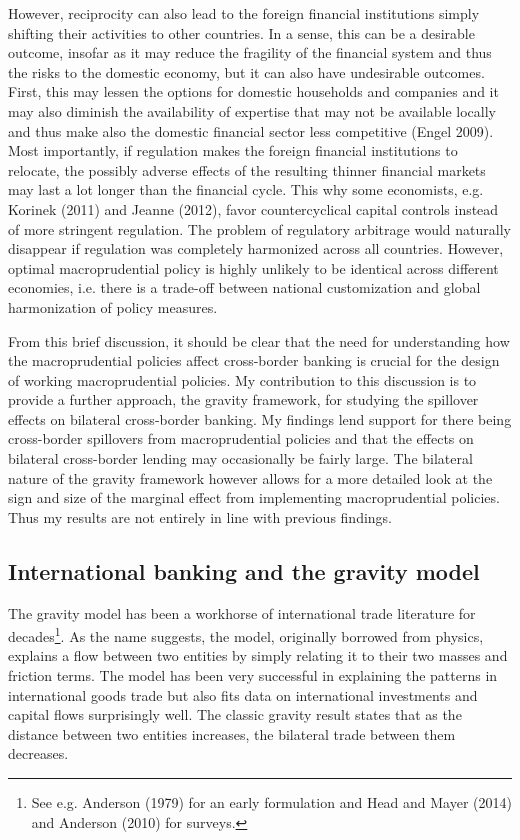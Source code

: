 \documentclass[12pt,a4paper]{article}
\begin{document}
However, reciprocity can also lead to the foreign financial institutions simply shifting their activities to other countries. In a sense, this can be a desirable outcome, insofar as it may reduce the fragility of the financial system and thus the risks to the domestic economy, but it can also have undesirable outcomes. First, this may lessen the options for domestic households and companies and it may also diminish the availability of expertise that may not be available locally and thus make also the domestic financial sector less competitive (Engel 2009). Most importantly, if regulation makes the foreign financial institutions to relocate, the possibly adverse effects of the resulting thinner financial markets may last a lot longer than the financial cycle. This why some economists, e.g. Korinek (2011) and Jeanne (2012), favor countercyclical capital controls instead of more stringent regulation. The problem of regulatory arbitrage would naturally disappear if regulation was completely harmonized across all countries. However, optimal macroprudential policy is highly unlikely to be identical across different economies, i.e. there is a trade-off between national customization and global harmonization of policy measures. 

From this brief discussion, it should be clear that the need for understanding how the macroprudential policies affect cross-border banking is crucial for the design of working macroprudential policies. My contribution to this discussion is to provide a further approach, the gravity framework, for studying the spillover effects on bilateral cross-border banking. My findings lend support for there being cross-border spillovers from macroprudential policies and that the effects on bilateral cross-border lending may occasionally be fairly large. The bilateral nature of the gravity framework however allows for a more detailed look at the sign and size of the marginal effect from implementing macroprudential policies. Thus my results are not entirely in line with previous findings. 

\subsection{International banking and the gravity model}

The gravity model has been a workhorse of international trade literature for decades\footnote{See e.g. Anderson (1979) for an early formulation and Head and Mayer (2014) and Anderson (2010) for surveys.}. As the name suggests, the model, originally borrowed from physics, explains a flow between two entities by simply relating it to their two masses and friction terms. The model has been very successful in explaining the patterns in international goods trade but also fits data on international investments and capital flows surprisingly well. The classic gravity result states that as the distance between two entities increases, the bilateral trade between them decreases. 
\end{document}
